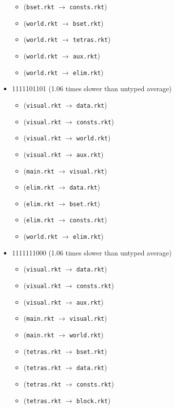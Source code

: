 \documentclass{article}
\newcommand{\mono}[1]{\texttt{#1}}
\begin{document}
\begin{itemize}
\begin{itemize}
  \item (\mono{bset.rkt} $\rightarrow$ \mono{consts.rkt})
  \item (\mono{world.rkt} $\rightarrow$ \mono{bset.rkt})
  \item (\mono{world.rkt} $\rightarrow$ \mono{tetras.rkt})
  \item (\mono{world.rkt} $\rightarrow$ \mono{aux.rkt})
  \item (\mono{world.rkt} $\rightarrow$ \mono{elim.rkt})
  \end{itemize}
\item 1111101101 (1.06 times slower than untyped average)
  \begin{itemize}
  \item (\mono{visual.rkt} $\rightarrow$ \mono{data.rkt})
  \item (\mono{visual.rkt} $\rightarrow$ \mono{consts.rkt})
  \item (\mono{visual.rkt} $\rightarrow$ \mono{world.rkt})
  \item (\mono{visual.rkt} $\rightarrow$ \mono{aux.rkt})
  \item (\mono{main.rkt} $\rightarrow$ \mono{visual.rkt})
  \item (\mono{elim.rkt} $\rightarrow$ \mono{data.rkt})
  \item (\mono{elim.rkt} $\rightarrow$ \mono{bset.rkt})
  \item (\mono{elim.rkt} $\rightarrow$ \mono{consts.rkt})
  \item (\mono{world.rkt} $\rightarrow$ \mono{elim.rkt})
  \end{itemize}
\item 1111111000 (1.06 times slower than untyped average)
  \begin{itemize}
  \item (\mono{visual.rkt} $\rightarrow$ \mono{data.rkt})
  \item (\mono{visual.rkt} $\rightarrow$ \mono{consts.rkt})
  \item (\mono{visual.rkt} $\rightarrow$ \mono{aux.rkt})
  \item (\mono{main.rkt} $\rightarrow$ \mono{visual.rkt})
  \item (\mono{main.rkt} $\rightarrow$ \mono{world.rkt})
  \item (\mono{tetras.rkt} $\rightarrow$ \mono{bset.rkt})
  \item (\mono{tetras.rkt} $\rightarrow$ \mono{data.rkt})
  \item (\mono{tetras.rkt} $\rightarrow$ \mono{consts.rkt})
  \item (\mono{tetras.rkt} $\rightarrow$ \mono{block.rkt})

\end{itemize}
\end{itemize}
\end{document}
